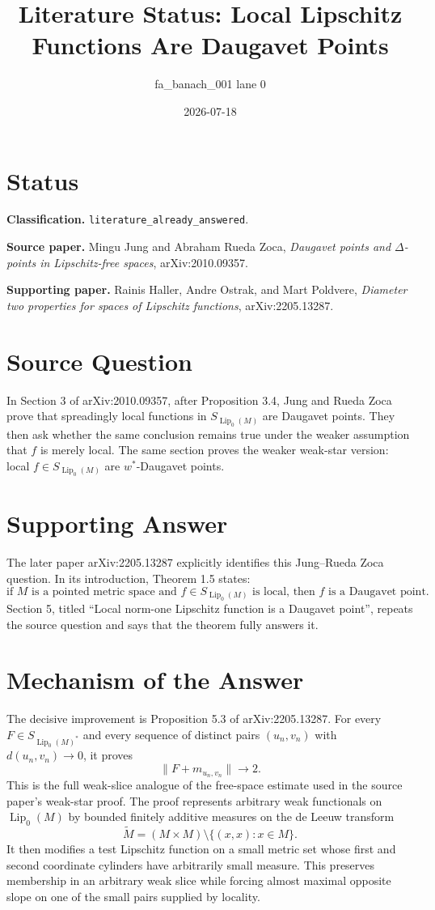 \documentclass[11pt]{article}
\title{Literature Status: Local Lipschitz Functions Are Daugavet Points}
\author{fa\_banach\_001 lane 0}
\date{2026-07-18}
\newcommand{\Lip}{\operatorname{Lip}_0}
\begin{document}
\maketitle

\section*{Status}

\textbf{Classification.} \texttt{literature\_already\_answered}.

\textbf{Source paper.} Mingu Jung and Abraham Rueda Zoca,
\emph{Daugavet points and $\Delta$-points in Lipschitz-free spaces},
arXiv:2010.09357.

\textbf{Supporting paper.} Rainis Haller, Andre Ostrak, and Mart Poldvere,
\emph{Diameter two properties for spaces of Lipschitz functions},
arXiv:2205.13287.

\section*{Source Question}

In Section 3 of arXiv:2010.09357, after Proposition 3.4, Jung and Rueda Zoca
prove that spreadingly local functions in $S_{\Lip(M)}$ are Daugavet points.
They then ask whether the same conclusion remains true under the weaker
assumption that $f$ is merely local. The same section proves the weaker
weak-star version: local $f\in S_{\Lip(M)}$ are $w^*$-Daugavet points.

\section*{Supporting Answer}

The later paper arXiv:2205.13287 explicitly identifies this Jung--Rueda Zoca
question. In its introduction, Theorem 1.5 states:
\[
  \text{if } M \text{ is a pointed metric space and } f\in S_{\Lip(M)}
  \text{ is local, then } f \text{ is a Daugavet point.}
\]
Section 5, titled ``Local norm-one Lipschitz function is a Daugavet point'',
repeats the source question and says that the theorem fully answers it.

\section*{Mechanism of the Answer}

The decisive improvement is Proposition 5.3 of arXiv:2205.13287. For every
$F\in S_{\Lip(M)^*}$ and every sequence of distinct pairs $(u_n,v_n)$ with
$d(u_n,v_n)\to0$, it proves
\[
  \|F+m_{u_n,v_n}\|\longrightarrow 2 .
\]
This is the full weak-slice analogue of the free-space estimate used in the
source paper's weak-star proof. The proof represents arbitrary weak
functionals on $\Lip(M)$ by bounded finitely additive measures on the de
Leeuw transform
\[
  \widetilde M=(M\times M)\setminus\{(x,x):x\in M\}.
\]
It then modifies a test Lipschitz function on a small metric set whose first
and second coordinate cylinders have arbitrarily small measure. This preserves
membership in an arbitrary weak slice while forcing almost maximal opposite
slope on one of the small pairs supplied by locality.
\end{document}
